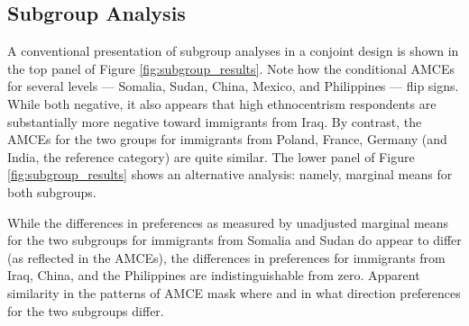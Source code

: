 \documentclass[a4paper,12pt]{article}\usepackage[]{graphicx}\usepackage[]{color}
\begin{document}
\subsection{Subgroup Analysis}\label{sec:subgroup}

A conventional presentation of subgroup analyses in a conjoint design is shown in the top panel of Figure \ref{fig:subgroup_results}. Note how the conditional AMCEs for several levels --- Somalia, Sudan, China, Mexico, and Philippines --- flip signs. While both negative, it also appears that high ethnocentrism respondents are substantially more negative toward immigrants from Iraq. By contrast, the AMCEs for the two groups for immigrants from Poland, France, Germany (and India, the reference category) are quite similar. The lower panel of Figure \ref{fig:subgroup_results} shows an alternative analysis: namely, marginal means for both subgroups.

While the differences in preferences as measured by unadjusted marginal means for the two subgroups for immigrants from Somalia and Sudan do appear to differ (as reflected in the AMCEs), the differences in preferences for immigrants from Iraq, China, and the Philippines are indistinguishable from zero. Apparent similarity in the patterns of AMCE mask where and in what direction preferences for the two subgroups differ.
\end{document}
